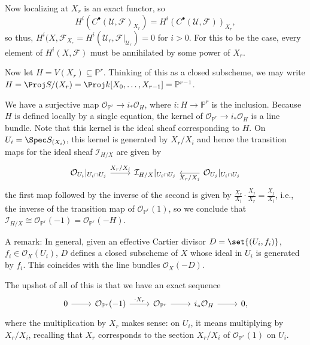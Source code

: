 Now localizing at $X_r$ is an exact functor, so
\[ H^i(C^\bullet(\mathcal{U}, \mathcal{F})_{X_r}) = H^i(C^\bullet(\mathcal{U}, \mathcal{F}))_{X_r}, \]
so thus, $H^i(X, \mathcal{F}_{X_r} = H^i(\mathcal{U}_r, \mathcal{F}|_{\mathcal{U}_r}) = 0$ for $i > 0$.
For this to be the case, every element of $H^i(X, \mathcal{F})$ must be annihilated by some
power of $X_r$.

Now let $H = V(X_r) \subseteq \mathbb{P}^r$. Thinking of this as a closed subscheme,
we may write $H = \Proj S/(X_r) = \Proj k[X_0, \ldots, X_{r-1}] = \mathbb{P}^{r-1}$.

We have a surjective map $\mathcal{O}_{\mathbb{P}^r} \to i_*\mathcal{O}_H$,
where $i\colon H\to \mathbb{P}^r$ is the inclusion. Because $H$ is defined
locally by a single equation, the kernel of $\mathcal{O}_{\mathbb{P}^r}\to i_*\mathcal{O}_H$
is a line bundle. Note that this kernel is the ideal sheaf corresponding to $H$.
On $U_i = \Spec S_{(X_i)}$, this kernel is generated by $X_r/X_i$ and hence the
transition maps for the ideal sheaf $\mathcal{I}_{H/X}$ are given by
\[\begin{tikzcd}
	\mathcal{O}_{U_i}|_{U_i\cap U_j}\ar[r, "X_r/X_i"] & \mathcal{I}_{H/X}|_{U_i\cap U_j} & \mathcal{O}_{U_j}|_{U_i\cap U_j}\ar[l, "X_r/X_j"]
\end{tikzcd}\]
the first map followed by the inverse of the second is given by $\frac{X_r}{X_i}\cdot\frac{X_j}{X_r} = \frac{X_j}{X_i}$,
i.e., the inverse of the transition map of $\mathcal{O}_{\mathbb{P}^r}(1)$, so we conclude that
$\mathcal{I}_{H/X} \cong \mathcal{O}_{\mathbb{P}^r}(-1) = \mathcal{O}_{\mathbb{P}^r}(-H)$.

A remark: In general, given an effective Cartier divisor $D = \set{(U_i, f_i)}$, $f_i \in \mathcal{O}_X(U_i)$,
$D$ defines a closed subscheme of $X$ whose ideal in $U_i$ is generated by $f_i$. This
coincides with the line bundles $\mathcal{O}_X(-D)$.

The upshot of all of this is that we have an exact sequence
\[\begin{tikzcd}
	0\ar[r] & \mathcal{O}_{\mathbb{P}^r}(-1)\ar[r, "\cdot X_r"] & \mathcal{O}_{\mathbb{P}^r}\ar[r] & i_*\mathcal{O}_H\ar[r] & 0,
\end{tikzcd}\]
where the multiplication by $X_r$ makes sense: on $U_i$, it means multiplying by $X_r/X_i$, recalling
that $X_r$ corresponds to the section $X_r/X_i$ of $\mathcal{O}_{\mathbb{P}^r}(1)$ on $U_i$.

